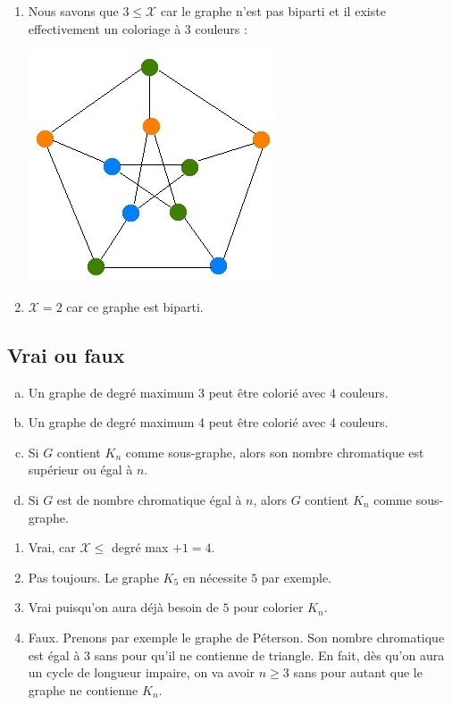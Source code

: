 \begin{solution}
  \begin{enumerate}
    \item Nous savons que $3 \leq \mathcal{X}$ car le graphe n'est pas biparti et il existe effectivement un coloriage à  $3$ couleurs :
    \begin{center}
    	\includegraphics[scale=0.4]{seance8ex2}
     \end{center}
    \item  $\mathcal{X} = 2$ car ce graphe est biparti.
  \end{enumerate}
\end{solution}

\subsection{Vrai ou faux}

\begin{enumerate}[(a)]
  \item Un graphe de degré maximum 3 peut être colorié avec 4 couleurs.
  \item Un graphe de degré maximum 4 peut être colorié avec 4 couleurs.
  \item Si $G$ contient $K_n$ comme sous-graphe, alors son nombre chromatique est supérieur ou égal à $n$.
  \item Si $G$ est de nombre chromatique égal à $n$, alors $G$ contient $K_n$ comme sous-graphe.
\end{enumerate}

\begin{solution}
  \begin{enumerate}
    \item Vrai, car $\mathcal{X} \leq$ degré max $+ 1 = 4$. 
    \item  Pas toujours. Le graphe $K_5$ en nécessite $5$ par exemple.
    \item Vrai puisqu'on aura déjà besoin de $5$ pour colorier $K_n$.
    \item Faux. Prenons par exemple le graphe de Péterson. Son nombre chromatique est égal à $3$ sans pour qu'il ne contienne de triangle. En fait, dès qu'on aura un cycle de longueur impaire, on va avoir $n \geq 3 $ sans pour autant que le graphe ne contienne $K_n$.
  \end{enumerate}
\end{solution}

